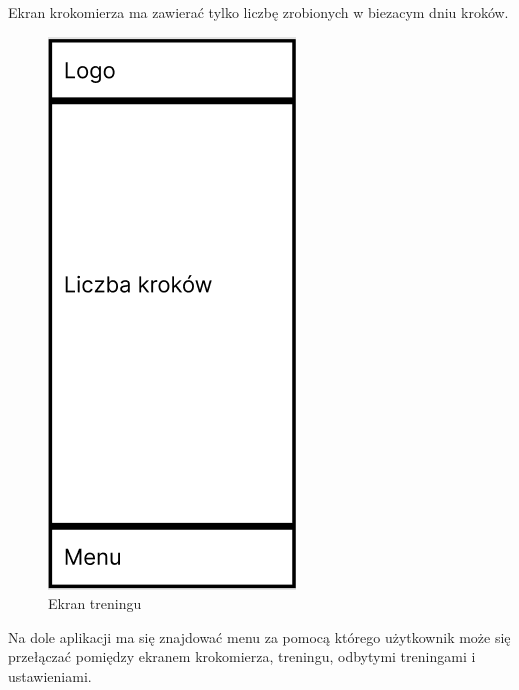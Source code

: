\hspace{0.60cm}Ekran krokomierza ma zawierać tylko liczbę zrobionych w biezacym dniu kroków.

\begin{figure}[!htb]
	\centering
	\includegraphics[width=.2\linewidth]{rys/ekran_krokomierza.png}
	\caption{Ekran treningu}
	\label{rys:rysunek003}
\end{figure}


\hspace{0.60cm}Na dole aplikacji ma się znajdować menu za pomocą którego użytkownik może się przełączać pomiędzy ekranem krokomierza, treningu, odbytymi treningami i ustawieniami.
 
 
